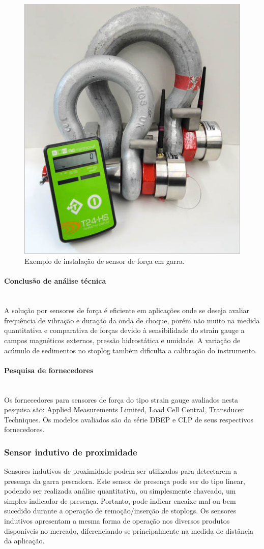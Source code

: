   \begin{figure}[H]
    \centering
    \includegraphics[width=0.4\columnwidth]{figs/forca/2.png}
    \caption{Exemplo de instalação de sensor de força em garra.}
    \label{forca_2}
\end{figure}

 \paragraph{Conclusão de análise técnica}\mbox{}\\

A solução por sensores de força é eficiente em aplicações onde se deseja avaliar frequência de vibração e duração da onda de choque, porém não muito na medida quantitativa e comparativa de forças devido à sensibilidade do strain gauge a campos magnéticos externos, pressão hidrostática e umidade. A variação de acúmulo de sedimentos no stoplog também dificulta a calibração do instrumento.

 \paragraph{Pesquisa de fornecedores}\mbox{}\\

Os fornecedores para sensores de força do tipo strain gauge avaliados nesta pesquisa são: Applied Measurements Limited, Load Cell Central, Transducer Techniques. Os modelos avaliados são da série DBEP e CLP de seus respectivos fornecedores.

\subsubsection{Sensor indutivo de proximidade}

Sensores indutivos de proximidade podem ser utilizados para detectarem a presença da garra pescadora. Este sensor de presença pode ser do tipo linear, podendo ser realizada análise quantitativa, ou simplesmente chaveado, um simples indicador de presença. Portanto, pode indicar encaixe mal ou bem sucedido durante a operação de remoção/inserção de stoplogs. Os sensores indutivos apresentam a mesma forma de operação nos diversos produtos disponíveis no mercado, diferenciando-se principalmente na medida de distância da aplicação.

